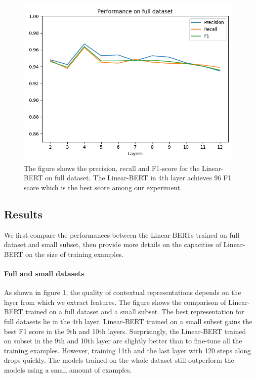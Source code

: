 \documentclass[11pt,a4paper]{article}
\begin{document}
\begin{figure}
\begin{center}
  \includegraphics[width=\linewidth]{f1-full.png}
  \caption{\label{fig:f1-full}The figure shows the precision, recall and F1-score for the Linear-BERT on full dataset. The Linear-BERT in 4th layer achieves 96 F1 score which is the best score among our experiment.}
\end{center}
\end{figure}

\subsection{Results}

We first compare the performances between the Linear-BERTs trained on full dataset and small subset, then provide more details on the capacities of Linear-BERT on the size of training examples.

\paragraph{Full and small datasets}
As shown in figure 1, the quality of contextual representations depends on the layer from which we extract features. The figure shows the comparison of Linear-BERT trained on a full dataset and a small subset.  The best representation for full datasets lie in the 4th layer. Linear-BERT trained on a small subset gains the best F1 score in the 9th and 10th layers. Surprisingly, the Linear-BERT trained on subset in the 9th and 10th layer are slightly better than to fine-tune all the training examples. However, training 11th and the last layer with 120 steps along drops quickly. The models trained on the whole dataset still outperform the models using a small amount of examples.
\end{document}
